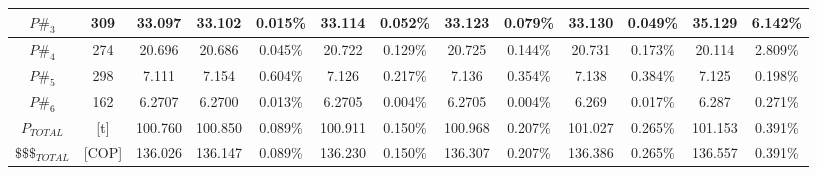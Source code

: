 \begin{table}
{\begin{tabular}{|cc|c|c|c|c|c|c|c|c|c|c|c|}
     \hline
     
     \cellcolor[HTML]{32CB00}$P\#_{3}$ & \cellcolor[HTML]{AAFF85}309 & \cellcolor[HTML]{FFD9AC}33.097 & \cellcolor[HTML]{BBFFBB}33.102 & \cellcolor[HTML]{BBFFBB}0.015\% & 33.114 & 0.052\% & 33.123 & 0.079\% & 33.130 & 0.049\% & \cellcolor[HTML]{FFD2B7}35.129 & \cellcolor[HTML]{FFD2B7}6.142\%\\
     
     \hline
     
     \cellcolor[HTML]{FFFE65}$P\#_{4}$ & \cellcolor[HTML]{FFFFC7}274 & \cellcolor[HTML]{FFD9AC}20.696 & \cellcolor[HTML]{BBFFBB}20.686 & \cellcolor[HTML]{BBFFBB}0.045\% & 20.722 & 0.129\% & 20.725 & 0.144\% & 20.731 & 0.173\% & \cellcolor[HTML]{FFD2B7}20.114 & \cellcolor[HTML]{FFD2B7}2.809\%\\
     
     \hline
     
     \cellcolor[HTML]{D34444}$P\#_{5}$ & \cellcolor[HTML]{FFCCC9}298 & \cellcolor[HTML]{FFD9AC}7.111 & \cellcolor[HTML]{BBFFBB}7.154 & \cellcolor[HTML]{BBFFBB}0.604\% & 7.126 & 0.217\% & 7.136 & 0.354\% & 7.138 & 0.384\% & \cellcolor[HTML]{FFD2B7}7.125 & \cellcolor[HTML]{FFD2B7}0.198\%\\
     
     \hline
     
     \cellcolor[HTML]{6665CD}$P\#_{6}$ & \cellcolor[HTML]{CBCEFB}162 & \cellcolor[HTML]{FFD9AC}6.2707 & \cellcolor[HTML]{BBFFBB}6.2700 & \cellcolor[HTML]{BBFFBB}0.013\% & 6.2705 & 0.004\% & 6.2705 & 0.004\% & 6.269 & 0.017\% & \cellcolor[HTML]{FFD2B7}6.287 & \cellcolor[HTML]{FFD2B7}0.271\%\\
     
     \hline
     \hline
     \hline
     

     
     \cellcolor[HTML]{EBEBEB}$P_{TOTAL}$ & \cellcolor[HTML]{EBEBEB}[t] & \cellcolor[HTML]{FFD9AC}100.760 & \cellcolor[HTML]{BBFFBB}100.850 & \cellcolor[HTML]{BBFFBB}0.089\% & 100.911 & 0.150\% & 100.968 & 0.207\% & 101.027 & 0.265\% & \cellcolor[HTML]{FFD2B7}101.153 & \cellcolor[HTML]{FFD2B7}0.391\% \\

     \hline
     
     \cellcolor[HTML]{EBEBEB}$\$\$\$_{TOTAL}$ & \cellcolor[HTML]{EBEBEB}[COP] & \cellcolor[HTML]{FFD9AC}136.026 & \cellcolor[HTML]{BBFFBB}136.147 & \cellcolor[HTML]{BBFFBB} 0.089\%& 136.230 & 0.150\% & 136.307 & 0.207\% & 136.386 & 0.265\% & \cellcolor[HTML]{FFD2B7}136.557 & \cellcolor[HTML]{FFD2B7} 0.391\%\\
     \hline

     
 \end{tabular}}
 \\
\end{table}
